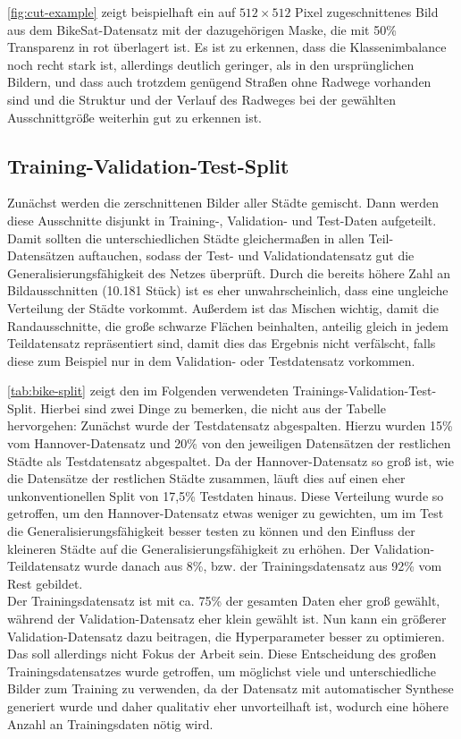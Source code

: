 \autoref{fig:cut-example} zeigt beispielhaft ein auf $512{\times}512$ Pixel zugeschnittenes Bild aus dem BikeSat-Datensatz 
mit der dazugehörigen Maske, die mit 50\% Transparenz in rot überlagert ist. Es ist zu erkennen, 
dass die Klassenimbalance noch recht stark ist, allerdings deutlich geringer, als in den ursprünglichen Bildern,
und dass auch trotzdem genügend Straßen ohne Radwege vorhanden sind und die Struktur und der Verlauf des Radweges 
bei der gewählten Ausschnittgröße weiterhin gut zu erkennen ist. 

\subsection{Training-Validation-Test-Split}

Zunächst werden die zerschnittenen Bilder aller Städte gemischt. Dann werden diese Ausschnitte disjunkt in 
Training-, Validation- und Test-Daten aufgeteilt. 
Damit sollten die unterschiedlichen Städte gleichermaßen in allen Teil-Datensätzen auftauchen, 
sodass der Test- und Validationdatensatz gut die Generalisierungsfähigkeit des Netzes überprüft. 
Durch die bereits höhere Zahl an Bildausschnitten (10.181 Stück) ist es eher unwahrscheinlich, 
dass eine ungleiche Verteilung der Städte vorkommt. Außerdem ist das Mischen wichtig, 
damit die Randausschnitte, die große schwarze Flächen beinhalten, anteilig gleich in 
jedem Teildatensatz repräsentiert sind, damit dies das Ergebnis nicht verfälscht, falls diese 
zum Beispiel nur in dem Validation- oder Testdatensatz vorkommen. 

\autoref{tab:bike-split} zeigt den im Folgenden verwendeten Trainings-Validation-Test-Split. 
Hierbei sind zwei Dinge zu bemerken, die nicht aus der Tabelle hervorgehen: 
Zunächst wurde der Testdatensatz abgespalten. Hierzu wurden 15\% vom Hannover-Datensatz und 
20\% von den jeweiligen Datensätzen der restlichen Städte als Testdatensatz abgespaltet. Da der Hannover-Datensatz so groß ist, wie die Datensätze der
restlichen Städte zusammen, läuft dies auf einen eher unkonventionellen Split von 17,5\% Testdaten hinaus. Diese Verteilung wurde so getroffen, 
um den Hannover-Datensatz etwas weniger zu gewichten, um im Test die Generalisierungsfähigkeit besser testen zu können
und den Einfluss der kleineren Städte auf die Generalisierungsfähigkeit zu erhöhen. Der Validation-Teildatensatz wurde danach aus 8\%, 
bzw. der Trainingsdatensatz aus 92\% vom Rest gebildet. \\
Der Trainingsdatensatz ist mit ca. 75\% der gesamten Daten eher groß gewählt, während der Validation-Datensatz eher klein gewählt ist. 
Nun kann ein größerer Validation-Datensatz dazu beitragen, die Hyperparameter besser zu optimieren. Das soll allerdings nicht Fokus der Arbeit sein.
Diese Entscheidung des großen Trainingsdatensatzes wurde getroffen,
um möglichst viele und unterschiedliche Bilder zum Training zu verwenden, da der Datensatz mit automatischer Synthese 
generiert wurde und daher qualitativ eher unvorteilhaft ist, wodurch eine höhere Anzahl an Trainingsdaten nötig wird.

